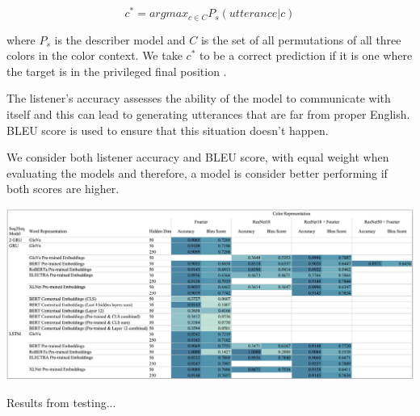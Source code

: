 \[c^{*} = argmax_{c \in C} P_{s} (utterance | c)\]

\par
where \(P_{s}\) is the describer model and \(C\) is the set of all permutations of all three colors in the color context. We take \(c^{*}\) to be a correct prediction if it is one where the target is in the privileged final position \citep{potts-2020-colors}.

\par
The listener's accuracy assesses the ability of the model to communicate with itself and this can lead to generating utterances that are far from proper English. BLEU score is used to ensure that this situation doesn’t happen.

\par
We consider both listener accuracy and BLEU score, with equal weight when evaluating the models and therefore, a model is consider better performing if both scores are higher.

\begin{table}[ht]
\centering
\includegraphics[width=\textwidth]{assets/heatmap.png}
\caption[Heatmap]{Results from testing...}
\label{table:heatmap}
\end{table}


